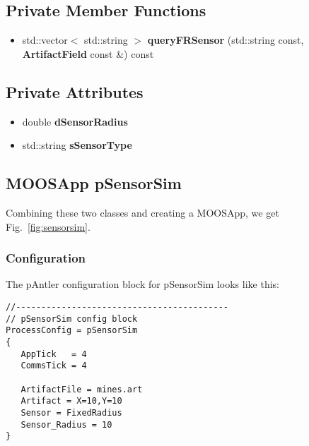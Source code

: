 \subsection*{Private Member Functions}
\begin{itemize}
\item std::vector$<$ std::string $>$ {\bf query\-FRSensor} (std::string const, {\bf Artifact\-Field} const \&) const
\end{itemize}
\subsection*{Private Attributes}
\begin{itemize}
\item double {\bf d\-Sensor\-Radius}
\item std::string {\bf s\-Sensor\-Type}
\end{itemize}

\subsection{MOOSApp pSensorSim}
\label{apppSensorSim}
Combining these two classes and creating a MOOSApp, we get Fig.~\ref{fig:sensorsim}.


\subsubsection{Configuration}
The pAntler configuration block for pSensorSim looks like this:
\scriptsize
\begin{verbatim}
//------------------------------------------
// pSensorSim config block
ProcessConfig = pSensorSim
{
   AppTick   = 4
   CommsTick = 4
   
   ArtifactFile = mines.art
   Artifact = X=10,Y=10
   Sensor = FixedRadius
   Sensor_Radius = 10   
}
\end{verbatim}
\normalsize

